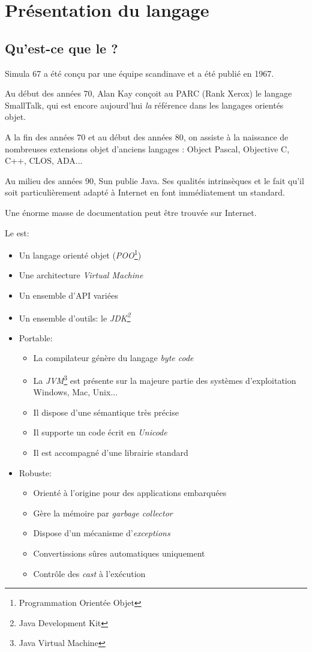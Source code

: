 \chapter{Présentation du langage}
		\section{Qu'est-ce que le \lang{} ?}
			
				Simula 67 a été conçu par une équipe scandinave et a été
				publié en 1967.
				
				Au début des années 70, Alan Kay conçoit au PARC (Rank
				Xerox) le langage SmallTalk, qui est encore aujourd'hui \emph{la} référence dans les langages orientés objet.
				
				A la fin des années 70 et au début des années 80, on assiste à la naissance de nombreuses extensions objet d'anciens langages : Object Pascal, Objective C, C++, CLOS, ADA...
				
				Au milieu des années 90, Sun publie Java. Ses qualités
				intrinsèques et le fait qu'il soit particulièrement adapté à
				Internet en font immédiatement un standard.
				
				Une énorme masse de documentation peut être trouvée sur
				Internet.		
				
				Le \lang{} est:
				\begin{itemize}
					\item Un langage orienté objet (\emph{POO}\footnote{Programmation Orientée Objet})
					\item Une architecture \emph{Virtual Machine}
					\item Un ensemble d'API variées
					\item Un ensemble d'outils: le \emph{JDK\footnote{Java Development Kit}}
					\item Portable:
						\begin{itemize}
							\item La compilateur \lang{} génère du langage \emph{byte code}
							\item La \emph{JVM}\footnote{Java Virtual Machine} est présente sur la majeure partie des systèmes d'exploitation Windows, Mac, Unix...
							\item Il dispose d'une sémantique très précise
							\item Il supporte un code écrit en \emph{Unicode}
							\item Il est accompagné d'une librairie standard
						\end{itemize}	
					\item Robuste:
						\begin{itemize}
							\item Orienté à l'origine pour des applications embarquées
							\item Gère la mémoire par \emph{garbage collector}
							\item Dispose d'un mécanisme d'\emph{exceptions}
							\item Convertissions sûres automatiques uniquement
							\item Contrôle des \emph{cast} à l'exécution
						\end{itemize}
				\end{itemize}
				
